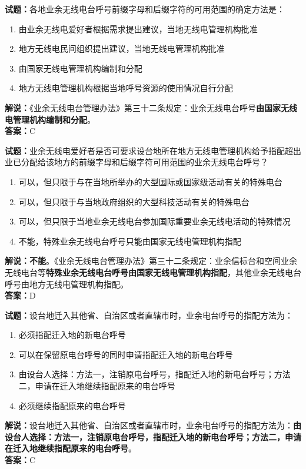 \documentclass{ctexbook}
\begin{document}
\bigskip


\noindent\textbf{试题：}各地业余无线电台呼号前缀字母和后缀字符的可用范围的确定方法是：
\begin{enumerate}[leftmargin=3em]
	\item 由业余无线电爱好者根据需求提出建议，当地无线电管理机构批准
	\item 地方无线电民间组织提出建议，当地无线电管理机构批准
	\item 由国家无线电管理机构编制和分配
	\item 地方无线电管理机构根据当地呼号资源的使用情况自行分配
\end{enumerate}
\noindent\textbf{解说：}《业余无线电台管理办法》第三十二条规定：业余无线电台呼号\textbf{由国家无线电管理机构编制和分配}。\\\noindent\textbf{答案：}C


\bigskip


\noindent\textbf{试题：}业余无线电爱好者是否可要求设台地所在地方无线电管理机构给予指配超出业已分配给该地方的前缀字母和后缀字符可用范围的业余无线电台呼号？
\begin{enumerate}[leftmargin=3em]
	\item 可以，但只限于与在当地所举办的大型国际或国家级活动有关的特殊电台
	\item 可以，但只限于与当地政府组织的大型科技活动有关的特殊电台
	\item 可以，但只限于当地业余无线电台参加国际重要业余无线电活动的特殊情况
	\item 不能，特殊业余无线电台呼号只能由国家无线电管理机构指配
\end{enumerate}
\textbf{解说：不能}。《业余无线电台管理办法》第三十二条规定：业余信标台和空间业余无线电台等\textbf{特殊业余无线电台呼号由国家无线电管理机构指配}，其他业余无线电台呼号由地方无线电管理机构指配。\\\noindent\textbf{答案：}D


\bigskip


\noindent\textbf{试题：}设台地迁入其他省、自治区或者直辖市时，业余电台呼号的指配方法为：
\begin{enumerate}[leftmargin=3em]
	\item 必须指配迁入地的新电台呼号
	\item 可以在保留原电台呼号的同时申请指配迁入地的新电台呼号
	\item 由设台人选择：方法一，注销原电台呼号，指配迁入地的新电台呼号；方法二，申请在迁入地继续指配原来的电台呼号
	\item 必须继续指配原来的电台呼号
\end{enumerate}
\noindent\textbf{解说：}设台地迁入其他省、自治区或者直辖市时，业余电台呼号的指配方法为：\textbf{由设台人选择：方法一，注销原电台呼号，指配迁入地的新电台呼号；方法二，申请在迁入地继续指配原来的电台呼号}。\\\noindent\textbf{答案：}C
\end{document}
